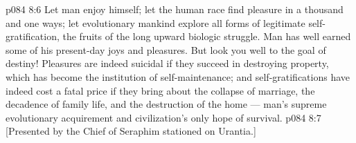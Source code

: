 \vs p084 8:6 \pc Let man enjoy himself; let the human race find pleasure in a thousand and one ways; let evolutionary mankind explore all forms of legitimate self\hyp{}gratification, the fruits of the long upward biologic struggle. Man has well earned some of his present\hyp{}day joys and pleasures. But look you well to the goal of destiny! Pleasures are indeed suicidal if they succeed in destroying property, which has become the institution of self\hyp{}maintenance; and self\hyp{}gratifications have indeed cost a fatal price if they bring about the collapse of marriage, the decadence of family life, and the destruction of the home --- man’s supreme evolutionary acquirement and civilization’s only hope of survival.
\vsetoff
\vs p084 8:7 [Presented by the Chief of Seraphim stationed on Urantia.]
\quizlink

